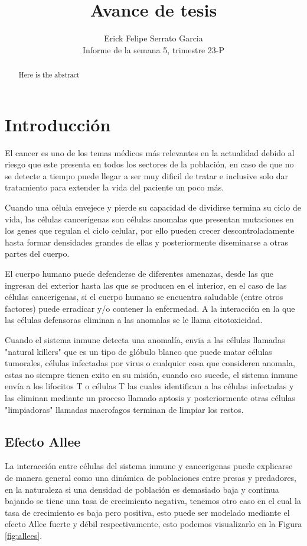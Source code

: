 \documentclass{article}
\title{Avance de tesis}
\author{Erick Felipe Serrato Garcia \\ Informe de la semana 5, trimestre 23-P}
\begin{document}
\maketitle

\begin{abstract}
Here is the abstract
\end{abstract}

\section{Introducción}

El cancer es uno de los temas médicos más relevantes en la actualidad debido al riesgo que este presenta en todos los sectores de la población, en caso de que no se detecte a tiempo puede llegar a ser muy dificil de tratar e inclusive solo dar tratamiento para extender la vida del paciente un poco más.

Cuando una célula envejece y pierde su capacidad de dividirse termina su ciclo de vida, las células cancerígenas son células anomalas que presentan mutaciones en los genes que regulan el ciclo celular, por ello pueden crecer descontroladamente hasta formar densidades grandes de ellas y posteriormente diseminarse a otras partes del cuerpo.

El cuerpo humano puede defenderse de diferentes amenazas, desde las que ingresan del exterior hasta las que se producen en el interior, en el caso de las células cancerigenas, si el cuerpo humano se encuentra saludable (entre otros factores) puede erradicar y/o contener la enfermedad. A la interacción en la que las células defensoras eliminan a las anomalas se le llama citotoxicidad.

Cuando el sistema inmune detecta una anomalía, envia a las células llamadas "natural killers" que es un tipo de glóbulo blanco que puede matar células tumorales, células infectadas por virus o cualquier cosa que consideren anomala, estas no siempre tienen exito en su misión, cuando eso sucede, el sistema inmune envía a los lifocitos T o células T las cuales identifican a las células infectadas y las eliminan mediante un proceso llamado aptosis y posteriormente otras células "limpiadoras" llamadas macrofagos terminan de limpiar los restos.

\subsection{Efecto Allee}

La interacción entre células del sistema inmune y cancerigenas puede explicarse de manera general como una dinámica de poblaciones entre presas y predadores, en la naturaleza si una densidad de población es demasiado baja y continua bajando se tiene una tasa de crecimiento negativa, tenemos otro caso en el cual la tasa de crecimiento es baja pero positiva, esto puede ser modelado mediante el efecto Allee fuerte y débil respectivamente, esto podemos visualizarlo en la Figura \ref{fig:allees}.
\end{document}
